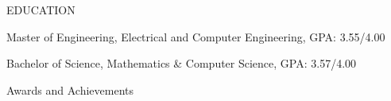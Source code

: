 \documentclass[10pt]{article}
\begin{document}
\begin{customsection}{EDUCATION}

    {Master of Engineering, Electrical and Computer Engineering, GPA: 3.55/4.00}

    {Bachelor of Science, Mathematics \& Computer Science, GPA: 3.57/4.00}

\end{customsection}
 
\begin{customsectionnoskip}{Awards and Achievements}


\end{customsectionnoskip}

\end{document}
